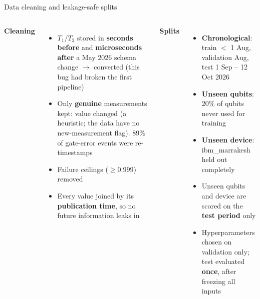 \documentclass[aspectratio=169,11pt]{beamer}
\begin{document}
\begin{frame}{Data cleaning and leakage-safe splits}
\begin{columns}[T]
\textbf{Cleaning}
\begin{itemize}
\item $T_1$/$T_2$ stored in \textbf{seconds before} and \textbf{microseconds after} a May 2026 schema change $\rightarrow$ converted (this bug had broken the first pipeline)
\item Only \textbf{genuine} measurements kept: value changed (a heuristic; the data have no new-measurement flag). 89\% of gate-error events were re-timestamps
\item Failure ceilings ($\geq 0.999$) removed
\item Every value joined by its \textbf{publication time}, so no future information leaks in
\end{itemize}
\textbf{Splits}
\begin{itemize}
\item \textbf{Chronological}: train $<$ 1 Aug, validation Aug, test 1 Sep -- 12 Oct 2026
\item \textbf{Unseen qubits}: 20\% of qubits never used for training
\item \textbf{Unseen device}: ibm\_marrakesh held out completely
\item Unseen qubits and device are scored on the \textbf{test period} only
\item Hyperparameters chosen on validation only; test evaluated \textbf{once}, after freezing all inputs
\end{itemize}
\end{columns}
\end{frame}
\end{document}
